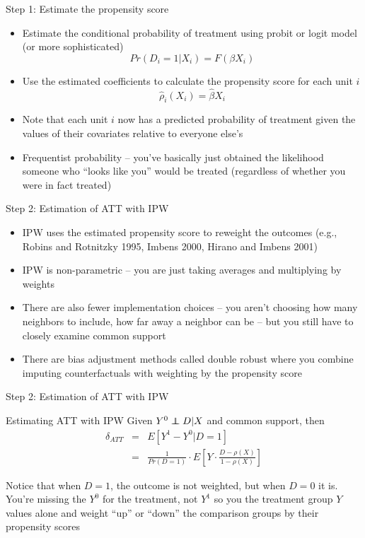 \documentclass{beamer}
\newcommand\independent{\protect\mathpalette{\protect\independenT}{\perp}}
\def\independenT#1#2{\mathrel{\rlap{$#1#2$}\mkern2mu{#1#2}}}
\begin{document}
\begin{frame}{Step 1: Estimate the propensity score}

		\begin{itemize}
		\item Estimate the conditional probability of treatment using probit or logit model (or more sophisticated) $$Pr(D_i=1|X_i) = F(\beta X_i)$$
		\item Use the estimated coefficients to calculate the propensity score for each unit $i$$$\widehat{\rho}_i(X_i) = \widehat{\beta} X_i$$
		\item Note that each unit $i$ now has a predicted probability of treatment given the values of their covariates relative to everyone else's 
		\item Frequentist probability -- you've basically just obtained the likelihood someone who ``looks like you'' would be treated (regardless of whether you were in fact treated)
		\end{itemize}
\end{frame}




\begin{frame}{Step 2: Estimation of ATT with IPW}

\begin{itemize}
	\item IPW uses the estimated propensity score to reweight the outcomes (e.g., Robins and Rotnitzky 1995, Imbens 2000, Hirano and Imbens 2001)
	\item IPW is non-parametric -- you are just taking averages and multiplying by weights
	\item There are also fewer implementation choices -- you aren't choosing how many neighbors to include, how far away a neighbor can be -- but you still have to closely examine common support
	\item There are bias adjustment methods called double robust where you combine imputing counterfactuals with weighting by the propensity score
\end{itemize}

\end{frame}
	
	

\begin{frame}{Step 2: Estimation of ATT with IPW}
	
		\begin{block}{Estimating ATT with IPW}
	Given $Y^0 \independent{D}|X$ and common support, then
		\begin{eqnarray*}
		\delta_{ATT}&=&E[Y^1-Y^0|D=1] \\
		&=& \frac{1}{Pr(D=1)} \cdot  E \left[ Y \cdot \frac{D-\rho(X)}{1-\rho(X)} \right]
		\end{eqnarray*}
	\end{block}Notice that when $D=1$, the outcome is not weighted, but when $D=0$ it is. You're missing the $Y^0$ for the treatment, not $Y^1$ so you the treatment group $Y$ values alone and weight ``up'' or ``down'' the comparison groups by their propensity scores

\end{frame}
\end{document}
